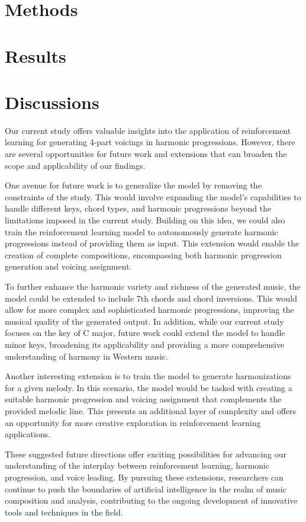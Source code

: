 \documentclass[12pt, letterpaper]{article}
\begin{document}
\section{Methods}

\section{Results}

\section{Discussions}

Our current study offers valuable insights into the application of reinforcement learning for generating 4-part voicings in harmonic progressions. However, there are several opportunities for future work and extensions that can broaden the scope and applicability of our findings.

One avenue for future work is to generalize the model by removing the constraints of the study. This would involve expanding the model's capabilities to handle different keys, chord types, and harmonic progressions beyond the limitations imposed in the current study. Building on this idea, we could also train the reinforcement learning model to autonomously generate harmonic progressions instead of providing them as input. This extension would enable the creation of complete compositions, encompassing both harmonic progression generation and voicing assignment.

To further enhance the harmonic variety and richness of the generated music, the model could be extended to include 7th chords and chord inversions. This would allow for more complex and sophisticated harmonic progressions, improving the musical quality of the generated output. In addition, while our current study focuses on the key of C major, future work could extend the model to handle minor keys, broadening its applicability and providing a more comprehensive understanding of harmony in Western music.

Another interesting extension is to train the model to generate harmonizations for a given melody. In this scenario, the model would be tasked with creating a suitable harmonic progression and voicing assignment that complements the provided melodic line. This presents an additional layer of complexity and offers an opportunity for more creative exploration in reinforcement learning applications.

These suggested future directions offer exciting possibilities for advancing our understanding of the interplay between reinforcement learning, harmonic progression, and voice leading. By pursuing these extensions, researchers can continue to push the boundaries of artificial intelligence in the realm of music composition and analysis, contributing to the ongoing development of innovative tools and techniques in the field.
\end{document}
